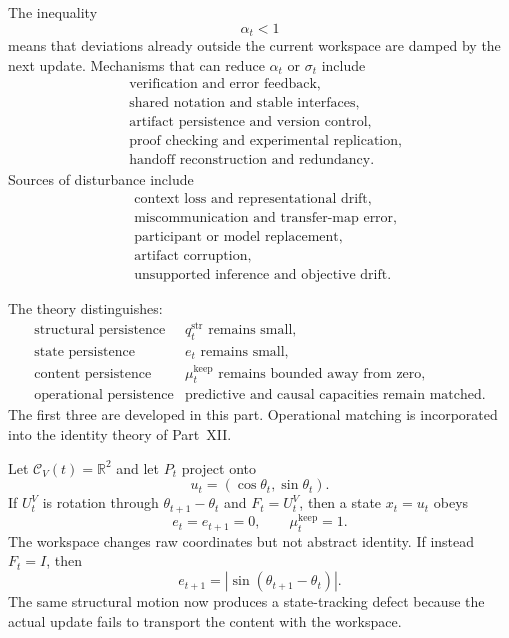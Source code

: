 The inequality
\[
\alpha_t<1
\]
means that deviations already outside the current workspace are damped by the
next update. Mechanisms that can reduce \(\alpha_t\) or \(\sigma_t\) include
\[
\begin{aligned}
&\text{verification and error feedback},\\
&\text{shared notation and stable interfaces},\\
&\text{artifact persistence and version control},\\
&\text{proof checking and experimental replication},\\
&\text{handoff reconstruction and redundancy}.
\end{aligned}
\]
Sources of disturbance include
\[
\begin{aligned}
&\text{context loss and representational drift},\\
&\text{miscommunication and transfer-map error},\\
&\text{participant or model replacement},\\
&\text{artifact corruption},\\
&\text{unsupported inference and objective drift}.
\end{aligned}
\]


The theory distinguishes:
\[
\begin{array}{ll}
\text{structural persistence}
& q_t^{\mathrm{str}}\text{ remains small},\\
\text{state persistence}
& e_t\text{ remains small},\\
\text{content persistence}
& \mu_t^{\mathrm{keep}}\text{ remains bounded away from zero},\\
\text{operational persistence}
& \text{predictive and causal capacities remain matched}.
\end{array}
\]
The first three are developed in this part. Operational matching is incorporated
into the identity theory of Part~XII.


Let \(\mathcal C_V(t)=\mathbb R^2\) and let \(P_t\) project onto
\[
u_t=(\cos\theta_t,\sin\theta_t).
\]
If \(U_t^V\) is rotation through
\(\theta_{t+1}-\theta_t\) and \(F_t=U_t^V\), then a state
\(x_t=u_t\) obeys
\[
e_t=e_{t+1}=0,
\qquad
\mu_t^{\mathrm{keep}}=1.
\]
The workspace changes raw coordinates but not abstract identity. If instead
\(F_t=I\), then
\[
e_{t+1}
=
|\sin(\theta_{t+1}-\theta_t)|.
\]
The same structural motion now produces a state-tracking defect because the
actual update fails to transport the content with the workspace.
